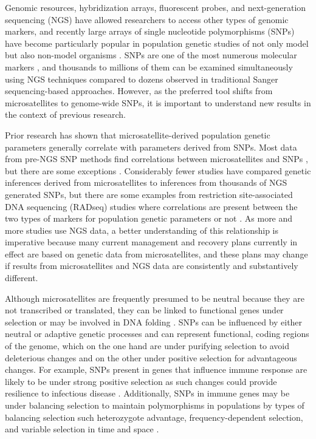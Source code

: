 \documentclass[english]{article}\usepackage[]{graphicx}\usepackage[]{color}
\begin{document}
Genomic resources, hybridization arrays, fluorescent probes, and next-generation sequencing (NGS) have allowed researchers to access other types of genomic markers, and recently large arrays of single nucleotide polymorphisms (SNPs) have become particularly popular in population genetic studies of not only model but also non-model organisms \citep{Allendorf_et_al_2010}. SNPs are one of the most numerous molecular markers \citep{Gupta_et_al_2001}, and thousands to millions of them can be examined simultaneously using NGS techniques compared to dozens observed in traditional Sanger sequencing-based approaches. However, as the preferred tool shifts from microsatellites to genome-wide SNPs, it is important to understand new results in the context of previous research. 

Prior research has shown that microsatellite-derived population genetic parameters generally correlate with parameters derived from SNPs. Most data from pre-NGS SNP methods find correlations between microsatellites and SNPs \citep[e.g.,][]{Ryynanen_et_al_2007, Narum_et_al_2008, Coates_et_al_2009, Glover_et_al_2010, Garke_et_al_2012}, but there are some exceptions \citep[e.g.,][]{Vali_et_al_2008, DeFaveri_et_al_2013}. Considerably fewer studies have compared genetic inferences derived from microsatellites to inferences from thousands of NGS generated SNPs, but there are some examples from restriction site-associated DNA sequencing (RADseq) studies where correlations are present \citep{Jeffries_et_al_2016} between the two types of markers for population genetic parameters  or not \citep{Lozier_2014}. As more and more studies use NGS data, a better understanding of this relationship is imperative because many current management and recovery plans currently in effect are based on genetic data from microsatellites, and these plans may change if results from microsatellites and NGS data are consistently and substantively different.

Although microsatellites are frequently presumed to be neutral because they are not transcribed or translated,  they can be linked to functional genes under selection \citep[e.g.,][]{Vasemagi_et_al_2005, Li_et_al_2014} or may be involved in DNA folding \citep{Li_et_al_2002}. SNPs can be influenced by either neutral or adaptive genetic processes and can represent functional, coding regions of the genome, which on the one hand are under purifying selection to avoid deleterious changes and on the other under positive selection for advantageous changes. For example, SNPs present in genes that influence immune response are likely to be under strong positive selection as such changes could provide resilience to infectious disease \citep{Bernatchez_and_Landry_2003, Sommer_2005}. Additionally, SNPs in immune genes may be under balancing selection to maintain polymorphisms in populations \citep[e.g.,][]{Niskanen_et_al_2014} by types of balancing selection such heterozygote advantage, frequency-dependent selection, and variable selection in time and space \citep{Hedrick_1999}.
\end{document}
